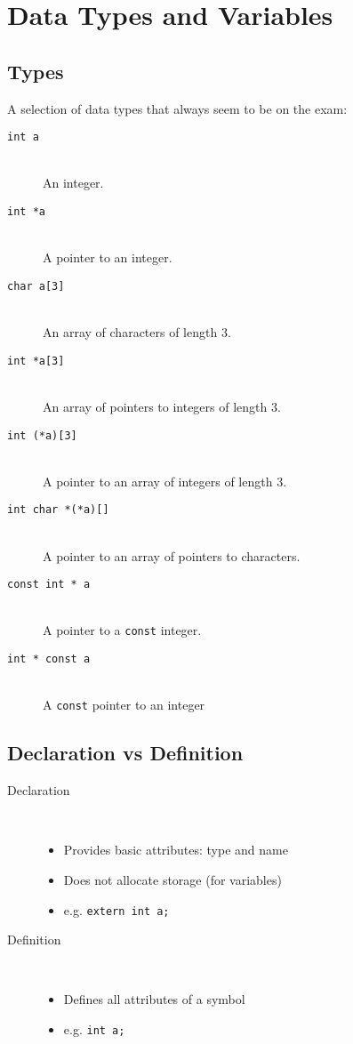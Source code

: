\documentclass[a4paper]{article}
\begin{document}
\tableofcontents

\section{Data Types and Variables}

\subsection{Types}

A selection of data types that always seem to be on the exam:

\begin{description}
  \item[\texttt{int a}] \hfill \\
    An integer.
  \item[\texttt{int *a}] \hfill \\
    A pointer to an integer.
  \item[\texttt{char a[3]}] \hfill \\
    An array of characters of length 3.
  \item[\texttt{int *a[3]}] \hfill \\
    An array of pointers to integers of length 3.
  \item[\texttt{int (*a)[3]}] \hfill \\
    A pointer to an array of integers of length 3.
  \item[\texttt{int char *(*a)[]}] \hfill \\
    A pointer to an array of pointers to characters.
  \item[\texttt{const int * a}] \hfill \\
    A pointer to a \texttt{const} integer.
  \item[\texttt{int * const a}] \hfill \\
    A \texttt{const} pointer to an integer
\end{description}

\subsection{Declaration vs Definition}

\begin{description}
  \item[Declaration] \hfill \\
    \begin{itemize}
      \item Provides basic attributes: type and name
      \item Does not allocate storage (for variables)
      \item e.g. \texttt{extern int a;}
    \end{itemize}

  \item[Definition] \hfill \\
    \begin{itemize}
      \item Defines all attributes of a symbol
      \item e.g. \texttt{int a;}
    \end{itemize}
\end{description}
\end{document}
